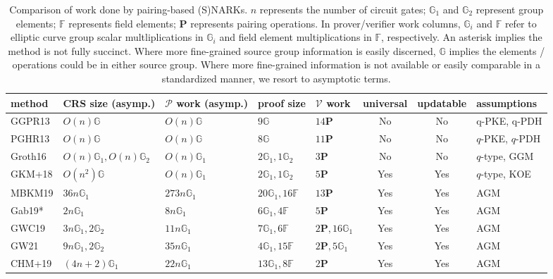 \begin{table}[!t]
\caption{Comparison of work done by pairing-based (S)NARKs. 
$n$ represents the number of circuit gates; $\mathbb{G}_1$ and 
$\mathbb{G}_2$ represent group elements; $\mathbb{F}$ represents field elements; $\mathbf{P}$ represents pairing operations. 
In prover/verifier work columns, $\mathbb{G}_i$ and $\mathbb{F}$ refer to elliptic curve group scalar multliplications in $\mathbb{G}_i$ 
and field element multiplications in $\mathbb{F}$, respectively. An asterisk implies the method is not fully succinct. Where more fine-grained 
source group information is easily discerned, $\mathbb{G}$ implies the elements / operations could be in either source group.
Where more fine-grained information is not available or easily comparable in a standardized manner, we resort to asymptotic terms.}
\label{tbl:snark}
\begin{tabular}{|l|l|l|p{3.2cm}|l|c|c|l|}
\hline
\toprule
method & CRS size (asymp.) & $\mathcal{P}$ work (asymp.) & proof size & $\mathcal{V}$ work & universal & updatable & assumptions \\ \hline\toprule
\midrule
GGPR13 & $O(n) \mathbb{G}$ & $O(n) \mathbb{G}$ & $9 \mathbb{G}$ & $14 \mathbf{P}$ & No & No & q-PKE, q-PDH \\ \hline
PGHR13 & $O(n) \mathbb{G}$ & $O(n) \mathbb{G}$ & $8 \mathbb{G}$ & $11 \mathbf{P}$ & No & No & $q$-PKE, $q$-PDH \\ \hline
Groth16 & $O(n) \mathbb{G}_1, O(n) \mathbb{G}_2$ & $O(n) \mathbb{G}_1$ & $2 \mathbb{G}_1, 1 \mathbb{G}_2$ & $3 \mathbf{P}$ & No & No & $q$-type, GGM \\ \hline
GKM+18 & $O(n^2) \mathbb{G}$ & $O(n) \mathbb{G}_1$ & $2 \mathbb{G}_1, 1 \mathbb{G}_2$ & $5 \mathbf{P}$ & Yes & Yes & $q$-type, KOE \\ \hline
MBKM19 & $36n \mathbb{G}_1$ & $273n \mathbb{G}_1$ & $20 \mathbb{G}_1, 16 \mathbb{F}$ & $13 \mathbf{P}$ & Yes & Yes & AGM \\ \hline
Gab19* & $2n \mathbb{G}_1$ & $8n \mathbb{G}_1$ & $6 \mathbb{G}_1, 4 \mathbb{F}$ & $5 \mathbf{P}$ & Yes & Yes & AGM \\ \hline
GWC19 & $3n \mathbb{G}_1, 2 \mathbb{G}_2$ & $11n \mathbb{G}_1$ & $7 \mathbb{G}_1, 6 \mathbb{F}$ & $2 \mathbf{P}, 16 \mathbb{G}_1$ & Yes & Yes & AGM \\ \hline
GW21 & $9n \mathbb{G}_1, 2 \mathbb{G}_2$ & $35n \mathbb{G}_1$ & $4 \mathbb{G}_1, 15 \mathbb{F}$ & $2 \mathbf{P}, 5 \mathbb{G}_1$ & Yes & Yes & AGM \\ \hline
CHM+19 & $(4n +2) \mathbb{G}_1$ & $22n \mathbb{G}_1$ & $13 \mathbb{G}_1, 8 \mathbb{F}$ & $2 \mathbf{P}$ & Yes & Yes & AGM \\ \hline\bottomrule
\bottomrule
\bottomrule
\end{tabular}
\end{table}
